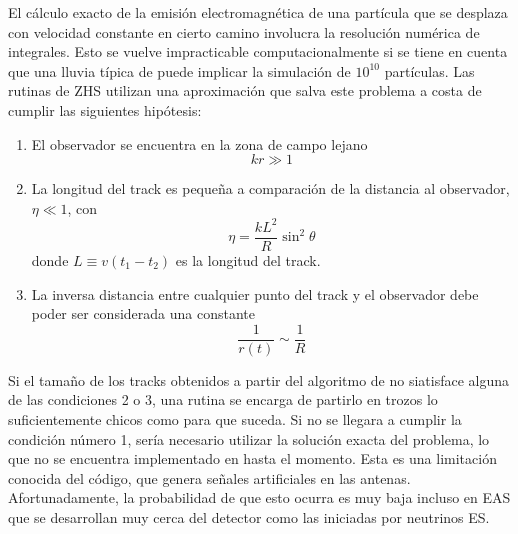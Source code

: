 	El c\'alculo exacto de la emisi\'on electromagn\'etica de una part\'icula que se desplaza con velocidad constante en cierto camino involucra la resoluci\'on num\'erica de integrales.
	Esto se vuelve impracticable computacionalmente si se tiene en cuenta que una lluvia típica de  puede implicar la simulación de $10^{10}$ partículas.
	Las rutinas de ZHS utilizan una aproximaci\'on que salva este problema a costa de cumplir las siguientes hip\'otesis:
	\begin{enumerate}
	 \item El observador se encuentra en la zona de campo lejano
	 \begin{equation}
	  kr\gg1
	 \end{equation}
	 \item La longitud del track es peque\~na a comparaci\'on de la distancia al observador, $\eta\ll1$, con
	 \begin{equation}
	  \eta = \frac{k L^2}{R}\sin^2\theta
	 \end{equation}
	 donde $L\equiv v(t_1-t_2)$ es la longitud del track.
	 \item La inversa distancia entre cualquier punto del track y el observador debe poder ser considerada una constante
	 \begin{equation}
	  \frac{1}{r(t)}\sim\frac{1}{R}
	 \end{equation}
	\end{enumerate}
	Si el tama\~no de los tracks obtenidos a partir del algoritmo de \aires{} no siatisface alguna de las condiciones 2 o 3, una rutina se encarga de partirlo en trozos lo suficientemente chicos como para que suceda.
	Si no se llegara a cumplir la condici\'on n\'umero 1, ser\'ia necesario utilizar la soluci\'on exacta del problema, lo que no se encuentra implementado en \zhs{} hasta el momento.
	Esta es una limitaci\'on conocida del c\'odigo, que genera se\~nales artificiales en las antenas. Afortunadamente, la probabilidad de que esto ocurra es muy baja incluso en EAS que se desarrollan muy cerca del detector como las iniciadas por neutrinos ES.
	
